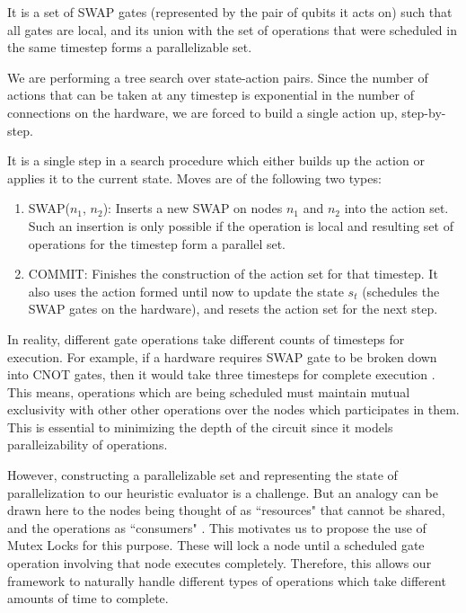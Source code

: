 \begin{defn}[Action]
    It is a set of SWAP gates (represented by the pair of qubits it acts on) such that all gates are local, and its union with the set of operations that were scheduled in the same timestep forms a parallelizable set.
\end{defn}

We are performing a tree search over state-action pairs. Since the number of actions that can be taken at any timestep is exponential in the number of connections on the hardware, we are forced to build a single action up, step-by-step. 

\begin{defn}[Move]
    It is a single step in a search procedure which either builds up the action or applies it to the current state. Moves are of the following two types:
    \begin{enumerate}
        \item SWAP($n_1$, $n_2$): Inserts a new SWAP on nodes $n_1$ and $n_2$ into the action set. Such an insertion is only possible if the operation is local and resulting set of operations for the timestep form a parallel set.
        \item COMMIT: Finishes the construction of the action set for that timestep. It also uses the action formed until now to update the state $s_t$ (schedules the SWAP gates on the hardware), and resets the action set for the next step.
    \end{enumerate}
\end{defn}

In reality, different gate operations take different counts of timesteps for execution. For example, if a hardware requires SWAP gate to be broken down into CNOT gates, then it would take three timesteps for complete execution \cite{utk_equiv_circuits}. This means, operations which are being scheduled must maintain mutual exclusivity with other other operations over the nodes which participates in them. This is essential to minimizing the depth of the circuit since it models paralleizability of operations.

However, constructing a parallelizable set and representing the state of parallelization to our heuristic evaluator is a challenge. But an analogy can be drawn here to the nodes being thought of as ``resources" that cannot be shared, and the operations as ``consumers" \cite{mutex_dijkstra}. This motivates us to propose the use of Mutex Locks for this purpose. These will lock a node until a scheduled gate operation involving that node executes completely. Therefore, this allows our framework to naturally handle different types of operations which take different amounts of time to complete.

